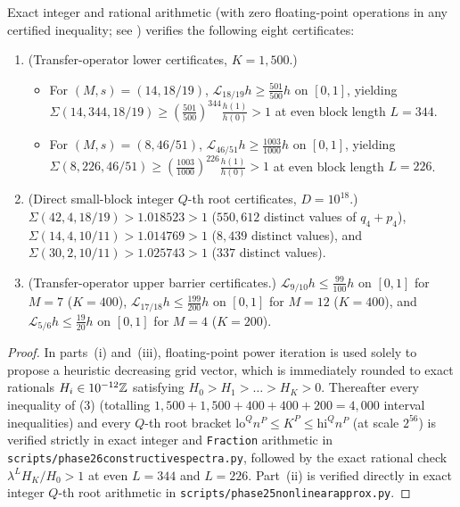 \documentclass[11pt]{article}
\newcommand{\ttt}[1]{\texttt{\begingroup\def\_{\textunderscore\discretionary{}{}{}}#1\endgroup}}
\newcommand{\Lop}{\mathcal{L}}
\begin{document}
\begin{proposition}\label{prop:certificates}
Exact integer and rational arithmetic (with zero floating-point operations in any certified inequality; see ) verifies the following eight certificates:
\begin{enumerate}[label=\textup{(\roman*)},nosep]
\item \textup{(Transfer-operator lower certificates, $K=1{,}500$.)}
\begin{itemize}[nosep]
\item For $(M,s)=(14,18/19)$, $\Lop_{18/19}h\ge\frac{501}{500}h$ on $[0,1]$, yielding $\Sigma(14,344,18/19)\ge(\frac{501}{500})^{344}\frac{h(1)}{h(0)}>1$ at even block length $L=344$.
\item For $(M,s)=(8,46/51)$, $\Lop_{46/51}h\ge\frac{1003}{1000}h$ on $[0,1]$, yielding $\Sigma(8,226,46/51)\ge(\frac{1003}{1000})^{226}\frac{h(1)}{h(0)}>1$ at even block length $L=226$.
\end{itemize}
\item \textup{(Direct small-block integer $Q$-th root certificates, $D=10^{18}$.)}
$\Sigma(42,4,18/19)>1.018523>1$ ($550{,}612$ distinct values of $q_4+p_4$),
$\Sigma(14,4,10/11)>1.014769>1$ ($8{,}439$ distinct values), and
$\Sigma(30,2,10/11)>1.025743>1$ ($337$ distinct values).
\item \textup{(Transfer-operator upper barrier certificates.)}
$\Lop_{9/10}h\le\frac{99}{100}h$ on $[0,1]$ for $M=7$ ($K=400$),
$\Lop_{17/18}h\le\frac{199}{200}h$ on $[0,1]$ for $M=12$ ($K=400$), and
$\Lop_{5/6}h\le\frac{19}{20}h$ on $[0,1]$ for $M=4$ ($K=200$).
\end{enumerate}
\end{proposition}

\begin{proof}
In parts~(i) and~(iii), floating-point power iteration is used solely to propose a heuristic decreasing grid vector, which is immediately rounded to exact rationals $H_i\in 10^{-12}\mathbb Z$ satisfying $H_0>H_1>\dots>H_K>0$. Thereafter every inequality of (3) (totalling $1{,}500+1{,}500+400+400+200=4{,}000$ interval inequalities) and every $Q$-th root bracket $\mathrm{lo}^Qn^P\le K^P\le\mathrm{hi}^Qn^P$ (at scale $2^{56}$) is verified strictly in exact integer and \ttt{Fraction} arithmetic in \ttt{scripts/phase26\_constructive\_spectra.py}, followed by the exact rational check $\lambda^L H_K/H_0>1$ at even $L=344$ and $L=226$. Part~(ii) is verified directly in exact integer $Q$-th root arithmetic in \ttt{scripts/phase25\_nonlinear\_approx.py}.
\end{proof}
\end{document}
